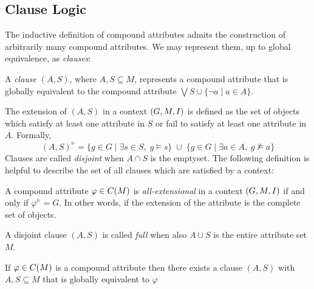 \subsection{Clause Logic}
\label{subsection:clause-logic}

The inductive definition of compound attributes admits the construction of arbitrarily many compound attributes. We may
represent them, up to global equivalence, as \textit{clauses}:
\begin{definition}
	\label{definition:clauses}

	A \emph{clause} $(A,S)$, where $A,S \subseteq M$, represents a compound attribute that is globally equivalent to the compound
	attribute $\bigvee S \cup \{\neg a \mid a \in A\}$.
\end{definition}

The extension of $(A,S)$ in a context $(G,M,\mathrel{I})$ is defined as the set of objects which satisfy at least one attribute in $S$
or fail to satisfy at least one attribute in $A$. Formally,
\[
	(A,S)^{\vDash}= \{ g \in G \mid \exists s \in S,\; g\vDash s \} \;\cup\; \{ g \in G \mid \exists a \in A,\; g \nvDash a
	\}
\]
Clauses are called \textit{disjoint} when $A \cap S$ is the emptyset. The following definition is helpful to describe the
set of all clauses which are satisfied by a context:
%
\begin{definition}
	\label{definition:all-extensional}

	A compound attribute $\varphi \in C(M)$ is \emph{all-extensional} in a context $(G,M,\mathrel{I})$ if and only if $\varphi^{\vDash}
	= G$. In other words, if the extension of the attribute is the complete set of objects.
\end{definition}

A disjoint clause $(A,S)$ is called \textit{full} when also $A \cup S$ is the entire attribute set $M$.
\begin{proposition}
	\label{proposition:clause-up-to-equivalence}

	If $\varphi \in C(M)$ is a compound attribute then there exists a clause $(A,S)$ with $A,S \subseteq M$ that is
	globally equivalent to $\varphi$
\end{proposition}

